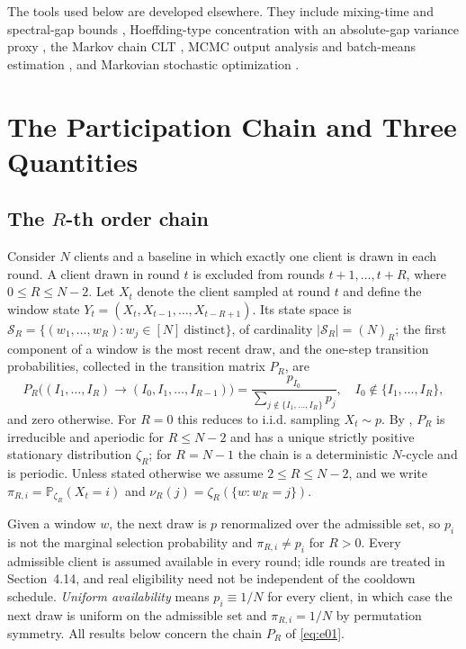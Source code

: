 \documentclass[twoside,11pt]{article}
\begin{document}
The tools used below are developed elsewhere. They include mixing-time and
spectral-gap bounds \citep{ref29,ref30}, Hoeffding-type concentration with an
absolute-gap variance proxy \citep{ref28}, the Markov chain CLT
\citep{ref4,ref26,ref24}, MCMC output analysis and batch-means estimation
\citep{ref31,ref32}, and Markovian stochastic optimization
\citep{ref33,ref34}.

\section{The Participation Chain and Three Quantities}
\subsection{\texorpdfstring{The $R$-th order chain}{The R-th order chain}}
Consider $N$ clients and a baseline in which exactly one client is drawn in each round. A client drawn in round $t$ is excluded from rounds $t+1,\dots,t+R$, where $0\leq R\leq N-2$. Let $X_t$ denote the client sampled at round $t$ and define the window state $Y_t=(X_t,X_{t-1},\dots,X_{t-R+1})$. Its state space is $\mathcal{S}_R=\{(w_1,\dots,w_R): w_j\in[N]\ \text{distinct}\}$, of cardinality $|\mathcal{S}_R|=(N)_R$; the first component of a window is the most recent draw, and the one-step transition probabilities, collected in the transition matrix $P_R$, are
\begin{equation}\label{eq:e01}
P_R\big((I_1,\dots,I_R)\to(I_0,I_1,\dots,I_{R-1})\big) =\dfrac{p_{I_0}}{\sum_{j\notin\{I_1,\dots,I_R\}}p_j},\quad I_0\notin\{I_1,\dots,I_R\},
\end{equation}
and zero otherwise. For $R=0$ this reduces to i.i.d. sampling $X_t\sim p$. By \citep[Lemma~1]{ref1}, $P_R$ is irreducible and aperiodic for $R\leq N-2$ and has a unique strictly positive stationary distribution $\zeta_R$; for $R=N-1$ the chain is a deterministic $N$-cycle and is periodic. Unless stated otherwise we assume $2\leq R\leq N-2$, and we write $\pi_{R,i}=\mathbb{P}_{\zeta_R}(X_t=i)$ and $\nu_R(j)=\zeta_R(\{w:w_R=j\})$.

Given a window $w$, the next draw is $p$ renormalized over the admissible set, so $p_i$ is not the marginal selection probability and $\pi_{R,i}\neq p_i$ for $R>0$. Every admissible client is assumed available in every round; idle rounds are treated in Section~4.14, and real eligibility need not be independent of the cooldown schedule. \emph{Uniform availability} means $p_i\equiv1/N$ for every client, in which case the next draw is uniform on the admissible set and $\pi_{R,i}=1/N$ by permutation symmetry. All results below concern the chain $P_R$ of \eqref{eq:e01}.
\end{document}
